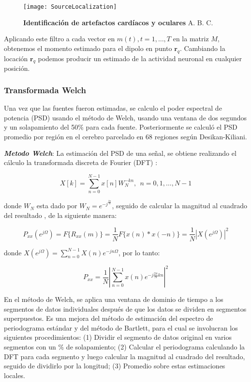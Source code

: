 \documentclass[11pt,letterpaper]{article}
\numberwithin{equation}{subsection}
\numberwithin{table}{subsection}
\begin{document}
\begin{figure}[H]
\centering
	\texttt{[image: SourceLocalization]}
	\captionsetup{labelfont=bf}
	\caption{\scriptsize \textbf{Identificación de artefactos cardíacos y oculares} A. B. C.}
	\label{fig:Fig16}
\end{figure}

\smallskip
\noindent Aplicando este filtro a cada vector en $m(t), t= 1, \ldots, T$ en la matriz $M$, obtenemos el momento estimado para el dipolo en punto $\mathbf{r}_q$. Cambiando la locación $\mathbf{r}_q$ podemos producir un estimado de la actividad neuronal en cualquier posición.   

\subsubsection{Transformada Welch}

\smallskip
\noindent Una vez que las fuentes fueron estimadas, se calculo el poder espectral de potencia (PSD) usando el método de Welch, usando una ventana de dos segundos y un solapamiento del 50\% para cada fuente. Posteriormente se calculó el PSD promedio por región en el cerebro parcelado en 68 regiones según Desikan-Kiliani.

\bigskip
\noindent \textbf{\textit{Metodo Welch}}: La estimación del PSD de una señal, se obtiene realizando el cálculo la transformada discreta de Fourier (DFT) :

\begin{equation}
X[k] = \sum_{n=0}^{N-1} x[n]W_N^{-kn}, \ \ n=0,1,\ldots,N-1 
\end{equation} 

\noindent donde $W_N$ esta dado por $W_N=e^{-j^{\frac{2\pi}{N}}}$, seguido de calcular la magnitud al cuadrado del resultado \cite{jwo2021windowing}, de la siguiente manera:

\begin{equation}
P_{xx}(e^{j\Omega})=F\{ R_{xx}(m)\} = \frac{1}{N}F\{ x(n)\ast x(-n)\} = \frac{1}{N}|X(e^{j\Omega})|^2
\end{equation}

\smallskip
\noindent donde $X(e^{j\Omega}) = \sum_{n=0}^{N-1} X(n)e^{-jn\Omega}$, por lo tanto: 

\begin{equation}
P_{xx} = \frac{1}{N}|\sum_{n=0}^{N-1}x(n)e^{-j\frac{2\pi}{N}kn}|^2
\end{equation} 

\bigskip
\noindent En el método de Welch, se aplica una ventana de dominio de tiempo a los segmentos de datos individuales después de que los datos se dividen en segmentos superpuestos. Es una mejora del método de estimación del espectro de periodograma estándar y del método de Bartlett, para el cual se involucran los siguientes procedimientos: (1) Dividir el segmento de datos original en varios segmentos con un \% de solapamiento; (2) Calcular el periodograma calculando la DFT para cada segmento y luego calcular la magnitud al cuadrado del resultado, seguido de dividirlo por la longitud; (3) Promedio sobre estas estimaciones locales.
\end{document}
